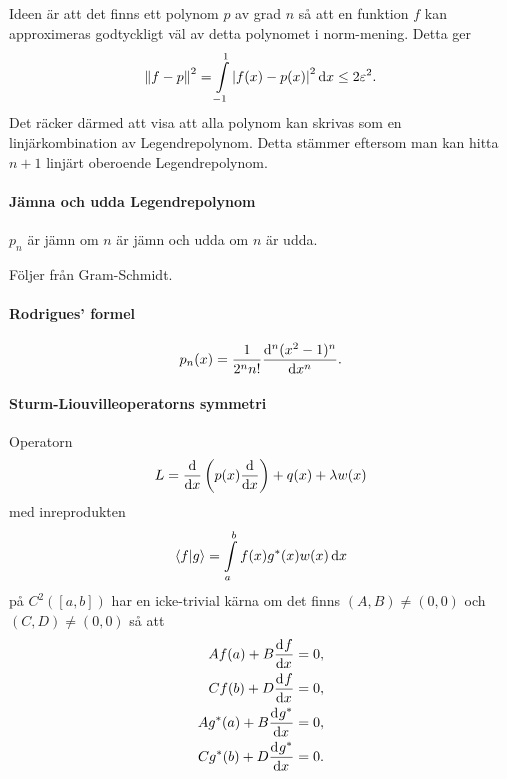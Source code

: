 \proof
Ideen är att det finns ett polynom $p$ av grad $n$ så att en funktion $f$ kan approximeras godtyckligt väl av detta polynomet i norm-mening. Detta ger
\begin{align*}
	\norm{f - p}^{2} = \int\limits_{-1}^{1}\abs{f(x) - p(x)}^{2}\dd{x} \leq 2\varepsilon^{2}.
\end{align*}
Det räcker därmed att visa att alla polynom kan skrivas som en linjärkombination av Legendrepolynom. Detta stämmer eftersom man kan hitta $n + 1$ linjärt oberoende Legendrepolynom.

\paragraph{Jämna och udda Legendrepolynom}
$p_{n}$ är jämn om $n$ är jämn och udda om $n$ är udda.

\proof
Följer från Gram-Schmidt.

\paragraph{Rodrigues' formel}
\begin{align*}
	p_{n}(x) = \frac{1}{2^{n}n!}\dv[n]{(x^{2} - 1) ^{n}}{x}.
\end{align*}

\proof

\paragraph{Sturm-Liouvilleoperatorns symmetri}
Operatorn
\begin{align*}
	L = \dv{x}\left(p(x)\dv{x}\right) + q(x) + \lambda w(x)
\end{align*}
med inreprodukten
\begin{align*}
	\bra{f}\ket{g} = \int\limits_{a}^{b}f(x)g^{*}(x)w(x)\dd{x}
\end{align*}
på $C^{2}([a, b])$ har en icke-trivial kärna om det finns $(A, B) \neq (0, 0)$ och $(C, D) \neq (0, 0)$ så att
\begin{align*}
	Af(a) + B\dv[]{f}{x} (a) = 0, \\
	Cf(b) + D\dv[]{f}{x} (b) = 0, \\
	Ag^{*}(a) + B\dv[]{g^{*}}{x} (a) = 0, \\
	Cg^{*}(b) + D\dv[]{g^{*}}{x} (b) = 0.
\end{align*}

